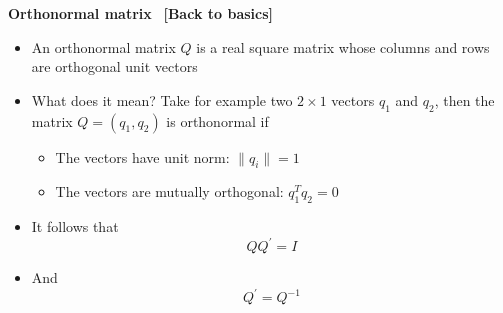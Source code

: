 \begin{frame}
{\color{note} \textbf{Orthonormal matrix} \ {\footnotesize \textbf{[Back to
basics]}}}\bigskip

\begin{itemize}
\item An orthonormal matrix $Q$ is a real square matrix whose columns and
rows are orthogonal unit vectors\bigskip

\item What does it mean? Take for example two $2\times 1$ vectors $q_{1}$
and $q_{2}$, then the matrix $Q=(q_{1},q_{2})$ is orthonormal if\smallskip

\begin{itemize}
\item The vectors have unit norm: $\parallel q_{i}\parallel =1$\medskip

\item The vectors are mutually orthogonal: $q_{1}^{T}q_{2}=0$\bigskip
\end{itemize}

\item It follows that 
\begin{equation*}
QQ^{\prime }=I
\end{equation*}

\item And%
\begin{equation*}
Q^{\prime }=Q^{-1}
\end{equation*}
\end{itemize}
\end{frame}


